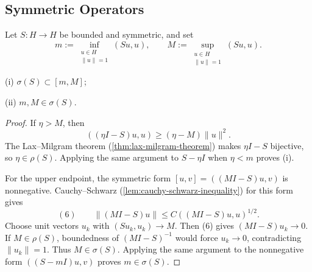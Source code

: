 \subsection{Symmetric Operators}
\label{sec:symmetric-operators}

Let $S:H\to H$ be bounded and symmetric, and set
\[
m:=\inf_{\substack{u\in H\\\|u\|=1}}(Su,u),
\qquad
M:=\sup_{\substack{u\in H\\\|u\|=1}}(Su,u).
\]

\begin{lemma}
\label{lem:bounds-on-spectrum-symmetric-operator}

(i) $\sigma(S)\subset[m,M]$;

(ii) $m,M\in\sigma(S)$.
\end{lemma}
\begin{proof}
\sketch If $\eta>M$, then
\[
((\eta I-S)u,u)\geq(\eta-M)\|u\|^2.
\]
The Lax--Milgram theorem (\cref{thm:lax-milgram-theorem}) makes $\eta I-S$ bijective, so $\eta\in\rho(S)$. Applying the same argument to $S-\eta I$ when $\eta<m$ proves (i).

For the upper endpoint, the symmetric form $[u,v]=((MI-S)u,v)$ is nonnegative. Cauchy--Schwarz (\cref{lem:cauchy-schwarz-inequality}) for this form gives
\[
(6)\qquad
\|(MI-S)u\|
\leq C((MI-S)u,u)^{1/2}.
\]
Choose unit vectors $u_k$ with $(Su_k,u_k)\to M$. Then (6) gives $(MI-S)u_k\to0$. If $M\in\rho(S)$, boundedness of $(MI-S)^{-1}$ would force $u_k\to0$, contradicting $\|u_k\|=1$. Thus $M\in\sigma(S)$. Applying the same argument to the nonnegative form $((S-mI)u,v)$ proves $m\in\sigma(S)$.
\end{proof}
